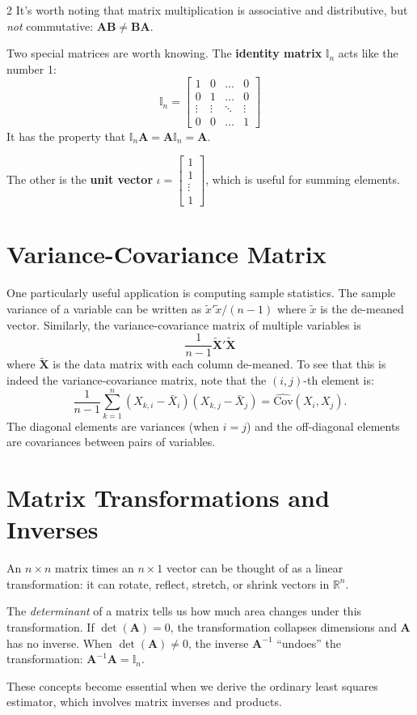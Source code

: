 \documentclass[12pt]{article}
\begin{document}
\begin{multicols}{2}
	It's worth noting that matrix multiplication is associative and distributive, but \emph{not} commutative: $\bm{A}\bm{B} \neq \bm{B}\bm{A}$.

	Two special matrices are worth knowing. The \textbf{identity matrix} $\mathbb{I}_n$ acts like the number 1:
	$$
		\mathbb{I}_n = \begin{bmatrix}
			1      & 0      & \dots  & 0      \\
			0      & 1      & \dots  & 0      \\
			\vdots & \vdots & \ddots & \vdots \\
			0      & 0      & \dots  & 1
		\end{bmatrix}
	$$
	It has the property that $\mathbb{I}_n \bm{A} = \bm{A} \mathbb{I}_n = \bm{A}$.

	The other is the \textbf{unit vector} $\iota = \begin{bmatrix} 1 \\ 1 \\ \vdots \\ 1 \end{bmatrix}$, which is useful for summing elements.

	\section*{Variance-Covariance Matrix}

	One particularly useful application is computing sample statistics. The sample variance of a variable can be written as $\tilde{x}' \tilde{x} / (n-1)$ where $\tilde{x}$ is the de-meaned vector. Similarly, the variance-covariance matrix of multiple variables is
	$$
		\frac{1}{n-1} \tilde{\bm{X}}' \tilde{\bm{X}}
	$$
	where $\tilde{\bm{X}}$ is the data matrix with each column de-meaned. To see that this is indeed the variance-covariance matrix, note that the $(i,j)$-th element is:
	$$
		\frac{1}{n-1} \sum_{k=1}^n (X_{k,i} - \bar{X}_i)(X_{k,j} - \bar{X}_j) = \widehat{\text{Cov}}(X_i, X_j).
	$$
	The diagonal elements are variances (when $i = j$) and the off-diagonal elements are covariances between pairs of variables.

	\section*{Matrix Transformations and Inverses}

	An $n \times n$ matrix times an $n \times 1$ vector can be thought of as a linear transformation: it can rotate, reflect, stretch, or shrink vectors in $\mathbb{R}^n$.

	The \emph{determinant} of a matrix tells us how much area changes under this transformation. If $\det(\bm{A}) = 0$, the transformation collapses dimensions and $\bm{A}$ has no inverse. When $\det(\bm{A}) \neq 0$, the inverse $\bm{A}^{-1}$ ``undoes'' the transformation: $\bm{A}^{-1}\bm{A} = \mathbb{I}_n$.

	These concepts become essential when we derive the ordinary least squares estimator, which involves matrix inverses and products.

\end{multicols}
\end{document}
